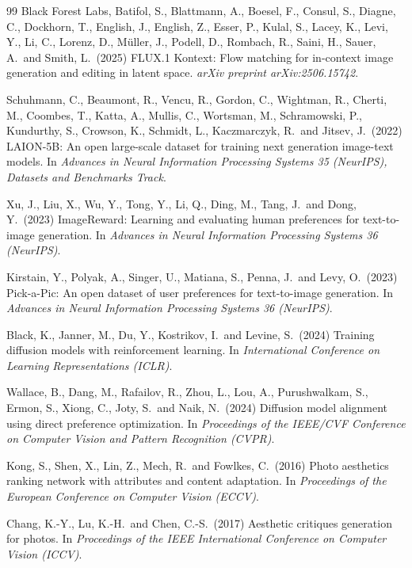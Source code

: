\documentclass{article}
\begin{document}
\begin{thebibliography}{99}
Black Forest Labs, Batifol, S., Blattmann, A., Boesel, F., Consul, S., Diagne, C., Dockhorn, T.,
English, J., English, Z., Esser, P., Kulal, S., Lacey, K., Levi, Y., Li, C., Lorenz, D.,
M\"uller, J., Podell, D., Rombach, R., Saini, H., Sauer, A.\ and Smith, L.\ (2025)
FLUX.1 Kontext: Flow matching for in-context image generation and editing in latent space.
{\it arXiv preprint arXiv:2506.15742}.

Schuhmann, C., Beaumont, R., Vencu, R., Gordon, C., Wightman, R., Cherti, M., Coombes, T.,
Katta, A., Mullis, C., Wortsman, M., Schramowski, P., Kundurthy, S., Crowson, K., Schmidt, L.,
Kaczmarczyk, R.\ and Jitsev, J.\ (2022)
LAION-5B: An open large-scale dataset for training next generation image-text models.
In {\it Advances in Neural Information Processing Systems 35 (NeurIPS), Datasets and Benchmarks Track}.

Xu, J., Liu, X., Wu, Y., Tong, Y., Li, Q., Ding, M., Tang, J.\ and Dong, Y.\ (2023)
ImageReward: Learning and evaluating human preferences for text-to-image generation.
In {\it Advances in Neural Information Processing Systems 36 (NeurIPS)}.

Kirstain, Y., Polyak, A., Singer, U., Matiana, S., Penna, J.\ and Levy, O.\ (2023)
Pick-a-Pic: An open dataset of user preferences for text-to-image generation.
In {\it Advances in Neural Information Processing Systems 36 (NeurIPS)}.

Black, K., Janner, M., Du, Y., Kostrikov, I.\ and Levine, S.\ (2024)
Training diffusion models with reinforcement learning.
In {\it International Conference on Learning Representations (ICLR)}.

Wallace, B., Dang, M., Rafailov, R., Zhou, L., Lou, A., Purushwalkam, S., Ermon, S., Xiong, C.,
Joty, S.\ and Naik, N.\ (2024)
Diffusion model alignment using direct preference optimization.
In {\it Proceedings of the IEEE/CVF Conference on Computer Vision and Pattern Recognition (CVPR)}.

Kong, S., Shen, X., Lin, Z., Mech, R.\ and Fowlkes, C.\ (2016)
Photo aesthetics ranking network with attributes and content adaptation.
In {\it Proceedings of the European Conference on Computer Vision (ECCV)}.

Chang, K.-Y., Lu, K.-H.\ and Chen, C.-S.\ (2017)
Aesthetic critiques generation for photos.
In {\it Proceedings of the IEEE International Conference on Computer Vision (ICCV)}.


\end{thebibliography}
\end{document}
